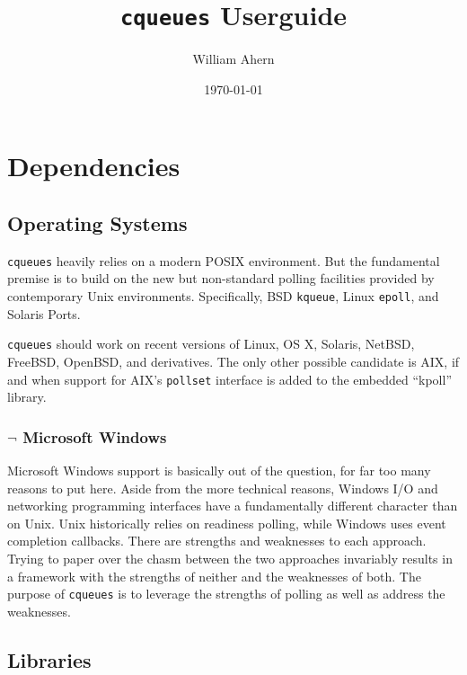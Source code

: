 \documentclass[11pt, oneside]{memoir}
\newcommand*{\cqueues}[0]{\texttt{cqueues}\xspace}
\newcommand*{\syscall}[1]{\texttt{#1}\xspace}
\begin{document}
\title{\cqueues Userguide}
\date{\today}
\author{William Ahern}
\maketitle

\tableofcontents
{}
\clearpage
\setcounter{page}{1}

\chapter{Dependencies}

\section{Operating Systems}

\cqueues heavily relies on a modern POSIX environment. But the fundamental premise is to build on the new but non-standard polling facilities provided by contemporary Unix environments. Specifically, BSD \syscall{kqueue}, Linux \syscall{epoll}, and Solaris Ports.

\cqueues should work on recent versions of Linux, OS X, Solaris, NetBSD, FreeBSD, OpenBSD, and derivatives. The only other possible candidate is AIX, if and when support for AIX's \syscall{pollset} interface is added to the embedded ``kpoll'' library.

\subsection{$\lnot$ Microsoft Windows}

Microsoft Windows support is basically out of the question, for far too many reasons to put here. Aside from the more technical reasons, Windows I/O and networking programming interfaces have a fundamentally different character than on Unix. Unix historically relies on readiness polling, while Windows uses event completion callbacks. There are strengths and weaknesses to each approach. Trying to paper over the chasm between the two approaches invariably results in a framework with the strengths of neither and the weaknesses of both. The purpose of \cqueues is to leverage the strengths of polling as well as address the weaknesses.

\section{Libraries}
\end{document}
